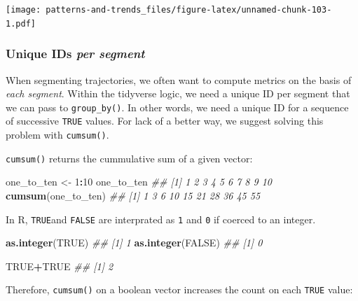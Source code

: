 \documentclass[]{book}
\newenvironment{Shaded}{\begin{snugshade}}{\end{snugshade}}
\newcommand{\CommentTok}[1]{\textcolor[rgb]{0.56,0.35,0.01}{\textit{#1}}}
\newcommand{\DecValTok}[1]{\textcolor[rgb]{0.00,0.00,0.81}{#1}}
\newcommand{\KeywordTok}[1]{\textcolor[rgb]{0.13,0.29,0.53}{\textbf{#1}}}
\newcommand{\NormalTok}[1]{#1}
\newcommand{\OperatorTok}[1]{\textcolor[rgb]{0.81,0.36,0.00}{\textbf{#1}}}
\newcommand{\OtherTok}[1]{\textcolor[rgb]{0.56,0.35,0.01}{#1}}
\newcommand{\StringTok}[1]{\textcolor[rgb]{0.31,0.60,0.02}{#1}}
\begin{document}
\texttt{[image: patterns-and-trends\_files/figure-latex/unnamed-chunk-103-1.pdf]}

\hypertarget{unique-ids-per-segment}{%
\subsubsection{\texorpdfstring{Unique IDs \emph{per segment}}{Unique IDs per segment}}\label{unique-ids-per-segment}}

When segmenting trajectories, we often want to compute metrics on the basis of \emph{each segment}. Within the tidyverse logic, we need a unique ID per segment that we can pass to \texttt{group\_by()}. In other words, we need a unique ID for a sequence of successive \texttt{TRUE} values. For lack of a better way, we suggest solving this problem with \texttt{cumsum()}.

\texttt{cumsum()} returns the cummulative sum of a given vector:

\begin{Shaded}
\begin{Highlighting}[]
\NormalTok{one_to_ten <-}\StringTok{ }\DecValTok{1}\OperatorTok{:}\DecValTok{10}
\NormalTok{one_to_ten}
\CommentTok{##  [1]  1  2  3  4  5  6  7  8  9 10}
\KeywordTok{cumsum}\NormalTok{(one_to_ten)}
\CommentTok{##  [1]  1  3  6 10 15 21 28 36 45 55}
\end{Highlighting}
\end{Shaded}

In R, \texttt{TRUE}and \texttt{FALSE} are interprated as \texttt{1} and \texttt{0} if coerced to an integer.

\begin{Shaded}
\begin{Highlighting}[]
\KeywordTok{as.integer}\NormalTok{(}\OtherTok{TRUE}\NormalTok{)}
\CommentTok{## [1] 1}
\KeywordTok{as.integer}\NormalTok{(}\OtherTok{FALSE}\NormalTok{)}
\CommentTok{## [1] 0}

\OtherTok{TRUE}\OperatorTok{+}\OtherTok{TRUE}
\CommentTok{## [1] 2}
\end{Highlighting}
\end{Shaded}

Therefore, \texttt{cumsum()} on a boolean vector increases the count on each \texttt{TRUE} value:
\end{document}
